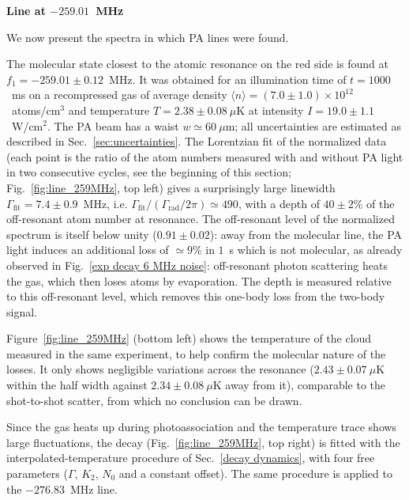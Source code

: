 \textbf{Line at $-259.01$~MHz}

We now present the spectra in which PA lines were found.

The molecular state closest to the atomic resonance on the red side is found at
$f_1 = -259.01 \pm 0.12$~MHz. It was obtained for an illumination time of
$t=1000$~ms on a recompressed gas of average density
$\langle n\rangle = (7.0\pm1.0)\times10^{12}$~atoms/cm$^3$ and temperature $T=2.38\pm0.08~\mu$K at intensity
$I=19.0\pm1.1$~W/cm$^2$. The PA beam has a waist $w\simeq60~\mu$m; all uncertainties are estimated as described in
Sec.~\ref{sec:uncertainties}. The
Lorentzian fit of the normalized data (each point is the ratio of the atom numbers measured with
and without PA light in two consecutive cycles, see the beginning of this section;
Fig.~\ref{fig:line_259MHz}, top left) gives a
surprisingly large linewidth $\Gamma_{\text{fit}} = 7.4\pm0.9$~MHz, i.e.
$\Gamma_{\text{fit}}/(\Gamma_{\text{rad}}/2\pi) \simeq 490$, with a depth of
$40\pm2\%$ of the off-resonant atom number at resonance. The off-resonant level of the
normalized spectrum is itself below unity ($0.91\pm0.02$): away from the molecular line,
the PA light induces an additional loss of $\simeq9\%$ in $1$~s which is not molecular, as
already observed in Fig.~\ref{exp decay 6 MHz noise}: off-resonant photon scattering heats the gas,
which then loses atoms by evaporation. The depth is measured relative to this off-resonant level,
which removes this one-body loss from the two-body signal.

Figure~\ref{fig:line_259MHz} (bottom left) shows the temperature of the cloud measured in the
same experiment, to help confirm the molecular nature of the losses. It only
shows negligible variations across the resonance ($2.43\pm0.07~\mu$K within the half width
against $2.34\pm0.08~\mu$K away from it), comparable to the shot-to-shot scatter, from
which no conclusion can be drawn.

Since the gas heats up during photoassociation and the temperature trace shows large
fluctuations, the decay (Fig.~\ref{fig:line_259MHz}, top right) is fitted with the interpolated-temperature
procedure of Sec.~\ref{decay dynamics}, with four free parameters ($\Gamma$, $K_2$, $N_0$ and a constant offset).
The same procedure is applied to the $-276.83$~MHz line.

